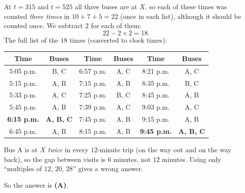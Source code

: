{
At $t=315$ and $t=525$ all three buses are at $X$, so each of these times was counted \emph{three times} in $10+7+5=22$ (once in each list), although it should be counted once. We subtract $2$ for each of them:
\[ 22-2\times 2=18. \]
The full list of the $18$ times (converted to clock times):
\begin{center}\small
\begin{tabular}{|c|c||c|c||c|c|}
\hline
\rowcolor{tmBlue!10}Time & Buses & Time & Buses & Time & Buses\\ \hline
5:05 p.m. & B, C & 6:57 p.m. & A, C & 8:21 p.m. & A, C\\ \hline
5:15 p.m. & A, B & 7:15 p.m. & A, B & 8:35 p.m. & B, C\\ \hline
5:33 p.m. & A, C & 7:25 p.m. & B, C & 8:45 p.m. & A, B\\ \hline
5:45 p.m. & A, B & 7:39 p.m. & A, C & 9:03 p.m. & A, C\\ \hline
\textbf{6:15 p.m.} & \textbf{A, B, C} & 7:45 p.m. & A, B & 9:15 p.m. & A, B\\ \hline
6:45 p.m. & A, B & 8:15 p.m. & A, B & \textbf{9:45 p.m.} & \textbf{A, B, C}\\ \hline
\end{tabular}
\end{center}
\begin{warnbox}Bus A is at $X$ \emph{twice} in every $12$-minute trip (on the way out and on the way back), so the gap between visits is $6$ minutes, not $12$ minutes. Using only ``multiples of $12$, $20$, $28$'' gives a wrong answer.\end{warnbox}
So the answer is \textbf{(A)}.
}

